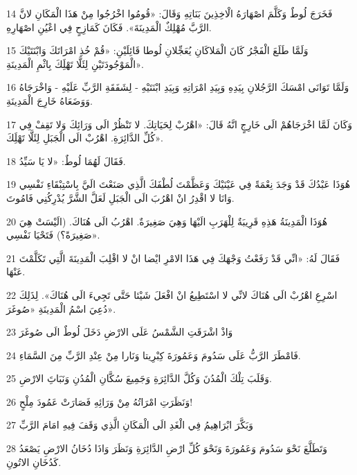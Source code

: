\par 14 فَخَرَجَ لُوطٌ وَكَلَّمَ اصْهَارَهُ الْاخِذِينَ بَنَاتِهِ وَقَالَ: «قُومُوا اخْرُجُوا مِنْ هَذَا الْمَكَانِ لانَّ الرَّبَّ مُهْلِكٌ الْمَدِينَةَ». فَكَانَ كَمَازِحٍ فِي اعْيُنِ اصْهَارِهِ.
\par 15 وَلَمَّا طَلَعَ الْفَجْرُ كَانَ الْمَلاكَانِ يُعَجِّلانِ لُوطا قَائِلَيْنِ: «قُمْ خُذِ امْرَاتَكَ وَابْنَتَيْكَ الْمَوْجُودَتَيْنِ لِئَلَّا تَهْلَِكَ بِاثْمِ الْمَدِينَةِ».
\par 16 وَلَمَّا تَوَانَى امْسَكَ الرَّجُلانِ بِيَدِهِ وَبِيَدِ امْرَاتِهِ وَبِيَدِ ابْنَتَيْهِ - لِشَفَقَةِ الرَّبِّ عَلَيْهِ - وَاخْرَجَاهُ وَوَضَعَاهُ خَارِجَ الْمَدِينَةِ.
\par 17 وَكَانَ لَمَّا اخْرَجَاهُمْ الَى خَارِجٍ انَّهُ قَالَ: «اهْرُبْ لِحَيَاتِكَ. لا تَنْظُرْ الَى وَرَائِكَ وَلا تَقِفْ فِي كُلِّ الدَّائِرَةِ. اهْرُبْ الَى الْجَبَلِ لِئَلَّا تَهْلَِكَ».
\par 18 فَقَالَ لَهُمَا لُوطٌ: «لا يَا سَيِّدُ.
\par 19 هُوَذَا عَبْدُكَ قَدْ وَجَدَ نِعْمَةً فِي عَيْنَيْكَ وَعَظَّمْتَ لُطْفَكَ الَّذِي صَنَعْتَ الَيَّ بِاسْتِبْقَاءِ نَفْسِي وَانَا لا اقْدِرُ انْ اهْرُبَ الَى الْجَبَلِ لَعَلَّ الشَّرَّ يُدْرِكُنِي فَامُوتَ.
\par 20 هُوَذَا الْمَدِينَةُ هَذِهِ قَرِيبَةٌ لِلْهَرَبِ الَيْهَا وَهِيَ صَغِيرَةٌ. اهْرُبُ الَى هُنَاكَ. (الَيْسَتْ هِيَ صَغِيرَةً؟) فَتَحْيَا نَفْسِي».
\par 21 فَقَالَ لَهُ: «انِّي قَدْ رَفَعْتُ وَجْهَكَ فِي هَذَا الامْرِ ايْضا انْ لا اقْلِبَ الْمَدِينَةَ الَّتِي تَكَلَّمْتَ عَنْهَا.
\par 22 اسْرِعِ اهْرُبْ الَى هُنَاكَ لانِّي لا اسْتَطِيعُ انْ افْعَلَ شَيْئا حَتَّى تَجِيءَ الَى هُنَاكَ». لِذَلِكَ دُعِيَ اسْمُ الْمَدِينَةِ «صُوغَرَ».
\par 23 وَاذْ اشْرَقَتِ الشَّمْسُ عَلَى الارْضِ دَخَلَ لُوطٌ الَى صُوغَرَ
\par 24 فَامْطَرَ الرَّبُّ عَلَى سَدُومَ وَعَمُورَةَ كِبْرِيتا وَنَارا مِنْ عِنْدِ الرَّبِّ مِنَ السَّمَاءِ.
\par 25 وَقَلَبَ تِلْكَ الْمُدُنَ وَكُلَّ الدَّائِرَةِ وَجَمِيعَ سُكَّانِ الْمُدُنِ وَنَبَاتَِ الارْضِ.
\par 26 وَنَظَرَتِ امْرَاتُهُ مِنْ وَرَائِهِ فَصَارَتْ عَمُودَ مِلْحٍ!
\par 27 وَبَكَّرَ ابْرَاهِيمُ فِي الْغَدِ الَى الْمَكَانِ الَّذِي وَقَفَ فِيهِ امَامَ الرَّبِّ
\par 28 وَتَطَلَّعَ نَحْوَ سَدُومَ وَعَمُورَةَ وَنَحْوَ كُلِّ ارْضِ الدَّائِرَةِ وَنَظَرَ وَاذَا دُخَانُ الارْضِ يَصْعَدُ كَدُخَانِ الاتُونِ.
